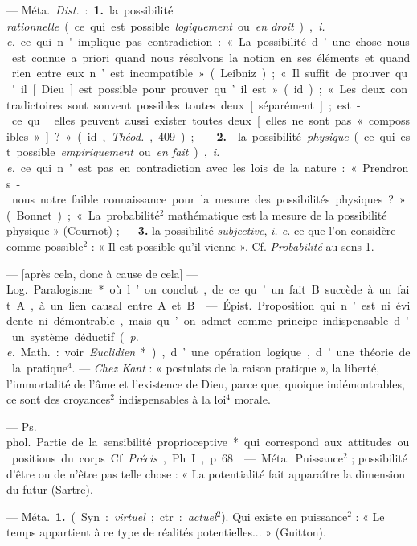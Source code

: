 \begin{itemize}[leftmargin=1cm, label=, itemsep=1pt]
 — \si{Méta.} {\it Dist.} : {\bf 1.} la possibilité {\it
rationnelle} (ce qui est possible {\it logiquement} ou {\it en droit}),
{\it i. e.} ce qui n'implique pas contradiction : « La possibilité d’une
chose nous est connue a priori quand nous résolvons la notion en ses éléments
et quand rien entre eux n’est incompatible » (Leibniz) ; « Il suffit de
prouver qu'il [Dieu] est possible pour prouver qu’il est » (id.) ; « Les deux
contradictoires sont souvent possibles toutes deux [séparément]; est-ce
qu'elles peuvent aussi exister toutes deux [elles ne sont pas « compossibles
»] ? » (id., {\it Théod.}, 409) ; —  {\bf 2.}  la possibilité
{\it physique} (ce qui est possible {\it empiriquement} ou {\it en fait}),
{\it i. e.} ce qui n’est pas en contradiction avec les lois de la nature : «
Prendrons-nous notre faible connaissance pour la mesure des possibilités
physiques ? » (Bonnet) ; « La probabilité$^2$ mathématique est la mesure de
la possibilité physique » (Cournot) ; — {\bf 3.}  la
possibilité {\it subjective}, {\it i. e.} ce que l’on considère comme
possible$^2$ : « Il est possible qu'il vienne ». Cf. {\it Probabilité} au
sens 1.

 — [après cela, donc à cause de cela] —
\si{Log.} Paralogisme* où l’on conclut, de ce qu’un fait B succède à un fait
A, à un lien causal entre A et B.

 — \si{Épist.} Proposition qui n’est ni évidente ni démontrable,
mais qu’on admet comme principe indispensable d'un système déductif
({\it p. e.} \si{Math.} : voir {\it Euclidien}*), d’une opération logique,
d’une théorie de la pratique$^4$. — {\it Chez Kant} : « postulats de la
raison pratique », la liberté, l’immortalité de l'âme et l’existence de Dieu,
parce que, quoique indémontrables, ce sont des croyances$^2$ indispensables à la
loi$^4$ morale.

 — \si{Ps. phol.} Partie de la sensibilité
proprioceptive* qui correspond aux attitudes ou positions du corps. Cf
{\it Précis}, Ph. I, p. 68.

 — \si{Méta.} Puissance$^2$ ; possibilité d’être ou de
n'être pas telle chose : « La potentialité fait apparaître la dimension du
futur (Sartre).

 — \si{Méta.} {\bf 1.} (Syn. : {\it virtuel} ; ctr. : {\it actuel}$^2$). Qui existe en puissance$^2$ : « Le temps appartient à ce type de réalités potentielles... » (Guitton).


\end{itemize}

